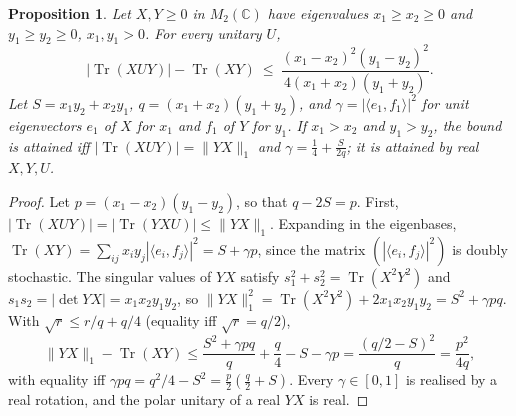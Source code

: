 \documentclass[11pt]{article}
\DeclareMathOperator{\Tr}{Tr}
\newcommand{\C}{\mathbb{C}}
\theoremstyle{plain}
\newtheorem{proposition}[theorem]{Proposition}
\theoremstyle{definition}
\theoremstyle{remark}
\begin{document}
\begin{proposition}\label{prop:k2}
Let $X,Y\ge0$ in $M_2(\C)$ have eigenvalues $x_1\ge x_2\ge0$ and $y_1\ge y_2\ge0$, $x_1,y_1>0$. For every unitary $U$,
\[
  |\Tr(XUY)|-\Tr(XY)\ \le\ \frac{(x_1-x_2)^2(y_1-y_2)^2}{4(x_1+x_2)(y_1+y_2)} .
\]
Let $S=x_1y_2+x_2y_1$, $q=(x_1+x_2)(y_1+y_2)$, and $\gamma=|\langle e_1,f_1\rangle|^2$ for unit eigenvectors $e_1$ of $X$ for
$x_1$ and $f_1$ of $Y$ for $y_1$. If $x_1>x_2$ and $y_1>y_2$, the bound is attained iff $|\Tr(XUY)|=\|YX\|_1$ and
$\gamma=\frac14+\frac S{2q}$; it is attained by real $X,Y,U$.
\end{proposition}
\begin{proof}
Let $p=(x_1-x_2)(y_1-y_2)$, so that $q-2S=p$. First, $|\Tr(XUY)|=|\Tr(YXU)|\le\|YX\|_1$. Expanding in the eigenbases,
$\Tr(XY)=\sum_{ij}x_iy_j|\langle e_i,f_j\rangle|^2=S+\gamma p$, since the matrix $(|\langle e_i,f_j\rangle|^2)$ is doubly
stochastic. The singular values of $YX$ satisfy $s_1^2+s_2^2=\Tr(X^2Y^2)$ and $s_1s_2=|\det YX|=x_1x_2y_1y_2$, so
$\|YX\|_1^2=\Tr(X^2Y^2)+2x_1x_2y_1y_2=S^2+\gamma pq$. With $\sqrt r\le r/q+q/4$ (equality iff $\sqrt r=q/2$),
\[
  \|YX\|_1-\Tr(XY)\le\frac{S^2+\gamma pq}q+\frac q4-S-\gamma p=\frac{(q/2-S)^2}q=\frac{p^2}{4q},
\]
with equality iff $\gamma pq=q^2/4-S^2=\frac p2(\frac q2+S)$. Every $\gamma\in[0,1]$ is realised by a real rotation, and the
polar unitary of a real $YX$ is real.
\end{proof}
\end{document}
